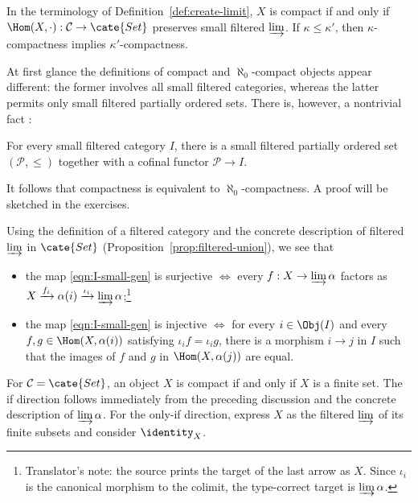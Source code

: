 In the terminology of Definition~\ref{def:create-limit}, $X$ is compact if and only if $\Hom(X,\cdot):\mathcal{C}\to\cate{Set}$ preserves small filtered $\varinjlim$. If $\kappa\leq\kappa'$, then $\kappa$-compactness implies $\kappa'$-compactness.

\begin{remark}\label{rem:filtered-poset}
	At first glance the definitions of compact and $\aleph_0$-compact objects appear different: the former involves all small filtered categories, whereas the latter permits only small filtered partially ordered sets. There is, however, a nontrivial fact \cite[Theorem 1.5]{AR94}:
	\begin{center}\begin{minipage}{0.7\textwidth}
		For every small filtered category $I$, there is a small filtered partially ordered set $(\mathcal{P},\leq)$ together with a cofinal functor $\mathcal{P}\to I$.
	\end{minipage}\end{center}
	It follows that compactness is equivalent to $\aleph_0$-compactness. A proof will be sketched in the exercises.
\end{remark}

Using the definition of a filtered category and the concrete description of filtered $\varinjlim$ in $\cate{Set}$ (Proposition~\ref{prop:filtered-union}), we see that
\begin{itemize}
	\item the map \eqref{eqn:I-small-gen} is surjective $\iff$ every $f:X\to\varinjlim\alpha$ factors as $X\xrightarrow{f_i}\alpha(i)\xrightarrow{\iota_i}\varinjlim\alpha$;\footnote{Translator's note: the source prints the target of the last arrow as $X$. Since $\iota_i$ is the canonical morphism to the colimit, the type-correct target is $\varinjlim\alpha$.}
	\item the map \eqref{eqn:I-small-gen} is injective $\iff$ for every $i\in\Obj(I)$ and every $f,g\in\Hom(X,\alpha(i))$ satisfying $\iota_i f=\iota_i g$, there is a morphism $i\to j$ in $I$ such that the images of $f$ and $g$ in $\Hom(X,\alpha(j))$ are equal.
\end{itemize}

\begin{example}\label{eg:Set-cpt}
	For $\mathcal{C}=\cate{Set}$, an object $X$ is compact if and only if $X$ is a finite set. The if direction follows immediately from the preceding discussion and the concrete description of $\varinjlim\alpha$. For the only-if direction, express $X$ as the filtered $\varinjlim$ of its finite subsets and consider $\identity_X$.
\end{example}


